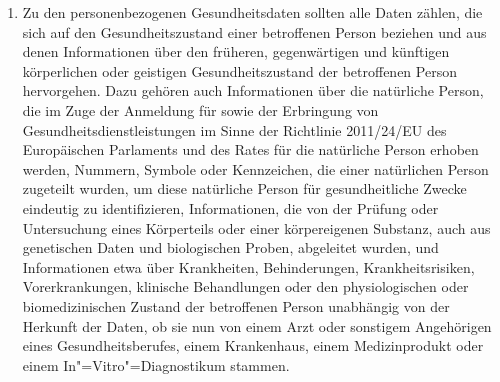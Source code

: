 \begin{enumerate}

   \item Zu den personenbezogenen Gesundheitsdaten sollten alle Daten zählen, die sich auf den Gesundheitszustand einer
    betroffenen Person beziehen und aus denen Informationen über den früheren, gegenwärtigen und künftigen körperlichen
    oder geistigen Gesundheitszustand der betroffenen Person hervorgehen. Dazu gehören auch Informationen über die
    natürliche Person, die im Zuge der Anmeldung für sowie der Erbringung von Gesundheitsdienstleistungen im Sinne der
    Richtlinie 2011/24/EU des Europäischen Parlaments und des Rates für die natürliche Person erhoben werden,
    Nummern, Symbole oder Kennzeichen, die einer natürlichen Person zugeteilt wurden, um diese natürliche Person für
    gesundheitliche Zwecke eindeutig zu identifizieren, Informationen, die von der Prüfung oder Untersuchung eines
    Körperteils oder einer körpereigenen Substanz, auch aus genetischen Daten und biologischen Proben, abgeleitet
    wurden, und Informationen etwa über Krankheiten, Behinderungen, Krankheitsrisiken, Vorerkrankungen, klinische
    Behandlungen oder den physiologischen oder biomedizinischen Zustand der betroffenen Person unabhängig von der
    Herkunft der Daten, ob sie nun von einem Arzt oder sonstigem Angehörigen eines Gesundheitsberufes, einem
    Krankenhaus, einem Medizinprodukt oder einem In"=Vitro"=Diagnostikum stammen.%
   \label{itm:eg-35}
   


\end{enumerate}
